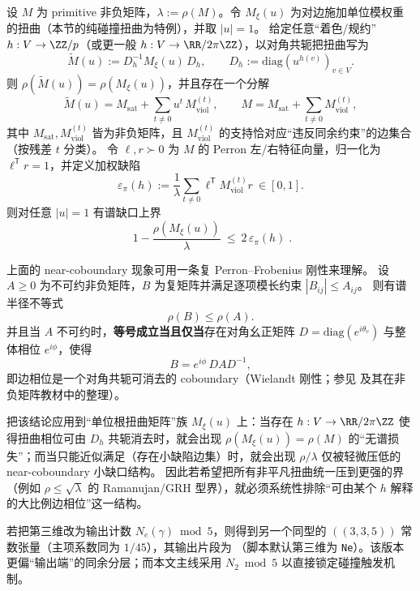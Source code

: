 \begin{remark}\label{prop:arity-defect-implies-gap}
设 \(M\) 为 primitive 非负矩阵，\(\lambda:=\rho(M)\)。令 \(M_\xi(u)\) 为对边施加单位模权重的扭曲（本节的纯碰撞扭曲为特例），并取 \(|u|=1\)。
给定任意“着色/规约” \(h:V\to \ZZ/p\)（或更一般 \(h:V\to \RR/2\pi\ZZ\)），以对角共轭把扭曲写为
\[
\widetilde M(u):=D_h^{-1}M_\xi(u)\,D_h,
\qquad D_h:=\mathrm{diag}(u^{h(v)})_{v\in V}.
\]
则 \(\rho(\widetilde M(u))=\rho(M_\xi(u))\)，并且存在一个分解
\[
\widetilde M(u)=M_{\mathrm{sat}}+\sum_{t\neq 0}u^{t}\,M_{\mathrm{viol}}^{(t)},
\qquad
M=M_{\mathrm{sat}}+\sum_{t\neq 0}M_{\mathrm{viol}}^{(t)},
\]
其中 \(M_{\mathrm{sat}},M_{\mathrm{viol}}^{(t)}\) 皆为非负矩阵，且 \(M_{\mathrm{viol}}^{(t)}\) 的支持恰对应“违反同余约束”的边集合（按残差 \(t\) 分类）。
令 \(\ell,r\succ 0\) 为 \(M\) 的 Perron 左/右特征向量，归一化为 \(\ell^{\mathsf T}r=1\)，并定义加权缺陷
\[
\varepsilon_\pi(h):=\frac{1}{\lambda}\sum_{t\neq 0}\ell^{\mathsf T}M_{\mathrm{viol}}^{(t)}r\ \in[0,1].
\]
则对任意 \(|u|=1\) 有谱缺口上界
\[
\boxed{\;
1-\frac{\rho(M_\xi(u))}{\lambda}\ \le\ 2\,\varepsilon_\pi(h)\; }.
\]
\end{remark}

\begin{remark}\label{rem:complex-pf-equality-coboundary}
上面的 near-coboundary 现象可用一条复 Perron--Frobenius 刚性来理解。
设 \(A\ge 0\) 为不可约非负矩阵，\(B\) 为复矩阵并满足逐项模长约束 \(|B_{ij}|\le A_{ij}\)。
则有谱半径不等式
$$
\rho(B)\le \rho(A).
$$
并且当 \(A\) 不可约时，\textbf{等号成立当且仅当}存在对角幺正矩阵 \(D=\mathrm{diag}(e^{i\theta_v})\) 与整体相位 \(e^{i\phi}\)，使得
$$
B=e^{i\phi}\,DAD^{-1},
$$
即边相位是一个对角共轭可消去的 coboundary（Wielandt 刚性；参见 \cite{Wielandt1950UnzerlegbareNichtnegative} 及其在非负矩阵教材中的整理）。
\par
把该结论应用到“单位根扭曲矩阵”族 \(M_\xi(u)\) 上：当存在 \(h:V\to \RR/2\pi\ZZ\) 使得扭曲相位可由 \(D_h\) 共轭消去时，就会出现 \(\rho(M_\xi(u))=\rho(M)\) 的“无谱损失”；而当只能近似满足（存在小缺陷边集）时，就会出现 \(\rho/\lambda\) 仅被轻微压低的 near-coboundary 小缺口结构。
因此若希望把所有非平凡扭曲统一压到更强的界（例如 \(\rho\le \sqrt{\lambda}\) 的 Ramanujan/GRH 型界），就必须系统性排除“可由某个 \(h\) 解释的大比例边相位”这一结构。
\end{remark}

\begin{remark}\label{rem:arity-335-ne-mod5}
若把第三维改为输出计数 $N_e(\gamma)\bmod 5$，则得到另一个同型的 $((3,3,5))$ 常数张量（主项系数同为 $1/45$），其输出片段为
\verb||
（脚本默认第三维为 \texttt{Ne}）。该版本更偏“输出端”的同余分层；而本文主线采用 $N_2\bmod 5$ 以直接锁定碰撞触发机制。
\end{remark}


